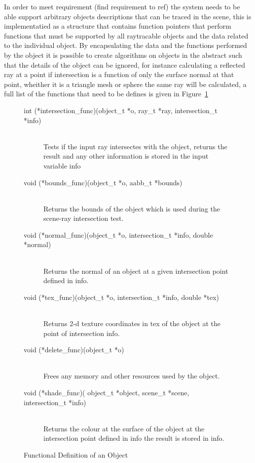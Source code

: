 In order to meet requirement \todo(find requirement to ref) the system needs to be able support arbitrary objects descriptions
that can be traced in the scene, this is implementatied as a structure that contains function pointers that perform functions
that must be supported by all raytracable objects and the data related to the individual object.
By encapsulating the data and the functions performed by the object it is possible to create algorithms on objects in the
abstract such that the details of the object can be ignored, for instance calculating a reflected ray at a point if intersection
is a function of only the surface normal at that point, wheither it is a triangle mesh or sphere the same ray will be calculated,
a full list of the functions that need to be defines is given in Figure~\ref{fig:object_funcs}

\begin{figure}[h]
\begin{description}
\item[int  (*intersection\_func)(object\_t *o, ray\_t *ray, intersection\_t *info)] \hfill \\
	Tests if the input ray intersectes with the object, returns the result and any other information is stored in the input variable info
\item[void (*bounds\_func)(object\_t *o, aabb\_t *bounds)] \hfill \\
	Returns the bounds of the object which is used during the scene-ray intersection test.
\item[void (*normal\_func)(object\_t *o, intersection\_t *info, double *normal)] \hfill \\
	Returns the normal of an object at a given intersection point defined in info.
\item[void (*tex\_func)(object\_t *o, intersection\_t *info, double *tex)] \hfill \\
	Returns 2-d texture coordinates in tex of the object at the point of intersection info.
\item[void (*delete\_func)(object\_t *o)] \hfill \\
	Frees any memory and other resources used by the object.
\item[void (*shade\_func)( object\_t *object, scene\_t *scene, intersection\_t *info)] \hfill \\
	Returns the colour at the surface of the object at the intersection point defined in info the result is stored in info.
\end{description}
\label{fig:object_funcs}
\caption{Functional Definition of an Object}
\end{figure}


